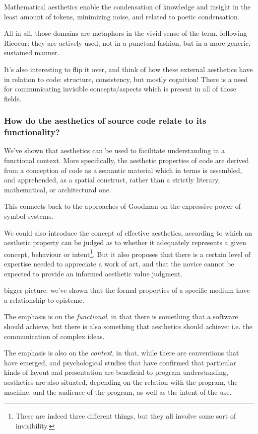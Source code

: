 Mathematical aesthetics enable the condensation of knowledge and insight in the least amount of tokens, minimizing noise, and related to poetic condensation.

All in all, those domains are metaphors in the vivid sense of the term, following Ricoeur: they are actively used, not in a punctual fashion, but in a more generic, sustained manner.

It's also interesting to flip it over, and think of how these external aesthetics have in relation to code: structure, consistency, but mostly cognition! There is a need for communicating invisible concepts/aspects which is present in all of those fields.

\subsubsection{How do the aesthetics of source code relate to its functionality?} %

We've shown that aesthetics can be used to facilitate understanding in a functional context. More specifically, the aesthetic properties of code are derived from a conception of code as a semantic material which in terms is assembled, and apprehended, as a spatial construct, rather than a strictly literary, mathematical, or architectural one.

This connects back to the approaches of Goodman on the expressive power of symbol systems.

We could also introduce the concept of effective aesthetics, according to which an aesthetic property can be judged as to whether it adequately represents a given concept, behaviour or intent\footnote{These are indeed three different things, but they all involve some sort of invisibility.}. But it also proposes that there is a certain level of expertise needed to appreciate a work of art, and that the novice cannot be expected to provide an informed aesthetic value judgment.

bigger picture: we've shown that the formal properties of a specific medium have a relationship to episteme.

The emphasis is on the \emph{functional}, in that there is something that a software should achieve, but there is also something that aesthetics should achieve: i.e. the communication of complex ideas.

The emphasis is also on the \emph{context}, in that, while there are conventions that have emerged, and psychological studies that have confirmed that particular kinds of layout and presentation are beneficial to program understanding, aesthetics are also situated, depending on the relation with the program, the machine, and the audience of the program, as well as the intent of the use.


